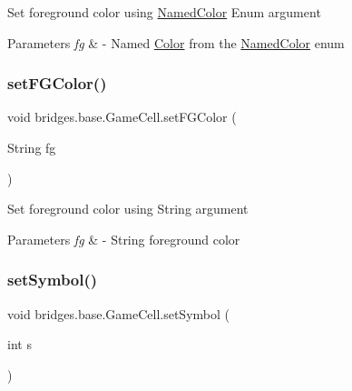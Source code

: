 Set foreground color using \mbox{\hyperlink{enumbridges_1_1base_1_1_named_color}{Named\+Color}} Enum argument 
\begin{DoxyParams}{Parameters}
{\em fg} & -\/ Named \mbox{\hyperlink{classbridges_1_1base_1_1_color}{Color}} from the \mbox{\hyperlink{enumbridges_1_1base_1_1_named_color}{Named\+Color}} enum \\
\hline
\end{DoxyParams}
\mbox{\label{classbridges_1_1base_1_1_game_cell_a3ffaf3300d8196a92d46e7c88ae32a86}} 
\subsubsection{\texorpdfstring{set\+F\+G\+Color()}{setFGColor()}\hspace{0.1cm}{\footnotesize\ttfamily [2/2]}}
{\footnotesize\ttfamily void bridges.\+base.\+Game\+Cell.\+set\+F\+G\+Color (\begin{DoxyParamCaption}\item[{String}]{fg }\end{DoxyParamCaption})}

Set foreground color using String argument 
\begin{DoxyParams}{Parameters}
{\em fg} & -\/ String foreground color \\
\hline
\end{DoxyParams}
\mbox{\label{classbridges_1_1base_1_1_game_cell_a5e6b4ed374ed3ec4bd6e72723e94848e}} 
\subsubsection{\texorpdfstring{set\+Symbol()}{setSymbol()}\hspace{0.1cm}{\footnotesize\ttfamily [1/2]}}
{\footnotesize\ttfamily void bridges.\+base.\+Game\+Cell.\+set\+Symbol (\begin{DoxyParamCaption}\item[{int}]{s }\end{DoxyParamCaption})}

